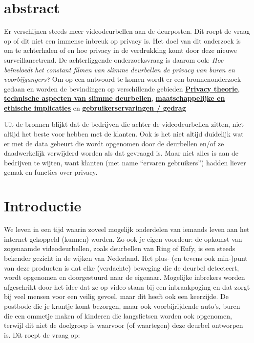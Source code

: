 \documentclass[nonacm, sigconf, balance=true]{acmart}
\begin{document}
    \maketitle

    \section{abstract}
    Er verschijnen steeds meer videodeurbellen aan de deurposten.
    Dit roept de vraag op of dit niet een immense inbreuk op privacy is.
    Het doel van dit onderzoek is om te achterhalen of en hoe privacy in de verdrukking komt door deze nieuwe surveillancetrend.
    De achterliggende onderzoeksvraag is daarom ook: \textit{Hoe beïnvloedt het constant filmen van slimme deurbellen de privacy van buren en voorbijgangers?}
    Om op een antwoord te komen wordt er een bronnenonderzoek gedaan en worden de bevindingen op verschillende gebieden \hyperref[subsec:privacy-theorie]{\textbf{Privacy theorie}}, \hyperref[subsec:technische-aspecten-van-slimme-deurbellen]{\textbf{technische aspecten van slimme deurbellen}}, \hyperref[subsec:maatschappelijke-en-ethische-implicaties]{\textbf{maatschappelijke en ethische implicaties}} en \hyperref[subsec:gebruikerservaring-/-gedrag2]{\textbf{gebruikerservaringen / gedrag}}

    Uit de bronnen blijkt dat de bedrijven die achter de videodeurbellen zitten, niet altijd het beste voor hebben met de klanten.
    Ook is het niet altijd duidelijk wat er met de data gebeurt die wordt opgenomen door de deurbellen en/of ze daadwerkelijk verwijderd worden als dat gevraagd is.
    Maar niet alles is aan de bedrijven te wijten, want klanten (met name ``ervaren gebruikers'') hadden liever gemak en functies over privacy.


    \section{Introductie}
    We leven in een tijd waarin zoveel mogelijk onderdelen van iemands leven aan het internet gekoppeld (kunnen) worden.
    Zo ook je eigen voordeur: de opkomst van zogenaamde videodeurbellen, zoals deurbellen van Ring of Eufy, is een steeds bekender gezicht in de wijken van Nederland.
    Het plus- (en tevens ook min-)punt van deze producten is dat elke (verdachte) beweging die de deurbel detecteert, wordt opgenomen en doorgestuurd naar de eigenaar.
    Mogelijke inbrekers worden afgeschrikt door het idee dat ze op video staan bij een inbraakpoging en dat zorgt bij veel mensen voor een veilig gevoel, maar dit heeft ook een keerzijde.
    De postbode die je krantje komt bezorgen, maar ook voorbijrijdende auto's, buren die een ommetje maken of kinderen die langsfietsen worden ook opgenomen, terwijl dit niet de doelgroep is waarvoor (of waartegen) deze deurbel ontworpen is.
    Dit roept de vraag op:
\end{document}
